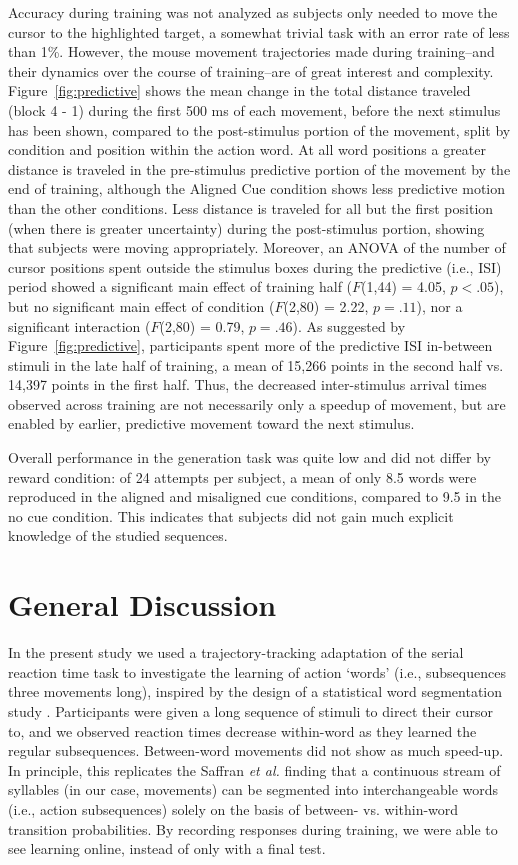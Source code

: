 \documentclass[conference]{IEEEtran}
\begin{document}
Accuracy during training was not analyzed as subjects only needed to move the cursor to the highlighted target, a somewhat trivial task with an error rate of less than 1\%. However, the mouse movement trajectories made during training--and their dynamics over the course of training--are of great interest and complexity. Figure~\ref{fig:predictive} shows the mean change in the total distance traveled (block 4 - 1) during the first 500 ms of each movement, before the next stimulus has been shown, compared to the post-stimulus portion of the movement, split by condition and position within the action word. At all word positions a greater distance is traveled in the pre-stimulus predictive portion of the movement by the end of training, although the Aligned Cue condition shows less predictive motion than the other conditions. Less distance is traveled for all but the first position (when there is greater uncertainty) during the post-stimulus portion, showing that subjects were moving appropriately. Moreover, an ANOVA of  the number of cursor positions spent outside the stimulus boxes during the predictive (i.e., ISI) period showed a significant main effect of training half ($F$(1,44) = 4.05, $p<.05$), but no significant main effect of condition ($F$(2,80) = 2.22, $p=.11$), nor a significant interaction ($F$(2,80) = 0.79, $p=.46$). As suggested by Figure~\ref{fig:predictive}, participants spent more of the predictive ISI in-between stimuli in the late half of training, a mean of 15,266 points in the second half vs. 14,397 points in the first half. Thus, the decreased inter-stimulus arrival times observed across training are not necessarily only a speedup of movement, but are enabled by earlier, predictive movement toward the next stimulus.


Overall performance in the generation task was quite low and did not differ by reward condition: of 24 attempts per subject, a mean of only 8.5 words were reproduced in the aligned and misaligned cue conditions, compared to 9.5 in the no cue condition. This indicates that subjects did not gain much explicit knowledge of the studied sequences.

\section{General Discussion}

In the present study we used a trajectory-tracking adaptation of the serial reaction time task to investigate the learning of action `words' (i.e., subsequences three movements long), inspired by the design of a statistical word segmentation study \cite{Saffran:1996}. Participants were given a long sequence of stimuli to direct their cursor to, and we observed reaction times decrease within-word as they learned the regular subsequences. Between-word movements did not show as much speed-up. In principle, this replicates the Saffran \textit{et al.} \cite{Saffran:1996} finding that a continuous stream of syllables (in our case, movements) can be segmented into interchangeable words (i.e., action subsequences) solely on the basis of between- vs. within-word transition probabilities. By recording responses during training, we were able to see learning online, instead of only with a final test.
\end{document}
